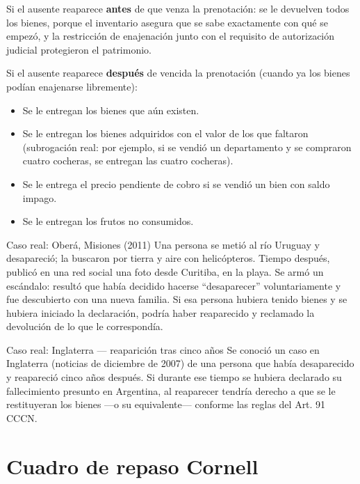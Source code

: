 \documentclass[12pt,oneside]{book}
\begin{document}
Si el ausente reaparece \textbf{antes} de que venza la prenotación: se le
devuelven todos los bienes, porque el inventario asegura que se sabe
exactamente con qué se empezó, y la restricción de enajenación junto con
el requisito de autorización judicial protegieron el patrimonio.

Si el ausente reaparece \textbf{después} de vencida la prenotación
(cuando ya los bienes podían enajenarse libremente):

\begin{itemize}
    \item Se le entregan los bienes que aún existen.
    \item Se le entregan los bienes adquiridos con el valor de los que faltaron (subrogación real: por ejemplo, si se vendió un departamento y se compraron cuatro cocheras, se entregan las cuatro cocheras).
    \item Se le entrega el precio pendiente de cobro si se vendió un bien con saldo impago.
    \item Se le entregan los frutos no consumidos.
\end{itemize}

\begin{example}{Caso real: Oberá, Misiones (2011)}
Una persona se metió al río Uruguay y desapareció; la buscaron por tierra
y aire con helicópteros. Tiempo después, publicó en una red social una
foto desde Curitiba, en la playa. Se armó un escándalo: resultó que había
decidido hacerse ``desaparecer'' voluntariamente y fue descubierto con
una nueva familia. Si esa persona hubiera tenido bienes y se hubiera
iniciado la declaración, podría haber reaparecido y reclamado la
devolución de lo que le correspondía.
\end{example}

\begin{example}{Caso real: Inglaterra — reaparición tras cinco años}
Se conoció un caso en Inglaterra (noticias de diciembre de 2007) de una
persona que había desaparecido y reapareció cinco años después. Si
durante ese tiempo se hubiera declarado su fallecimiento presunto en
Argentina, al reaparecer tendría derecho a que se le restituyeran los
bienes —o su equivalente— conforme las reglas del Art. 91 CCCN.
\end{example}


\section{Cuadro de repaso Cornell}
\end{document}

